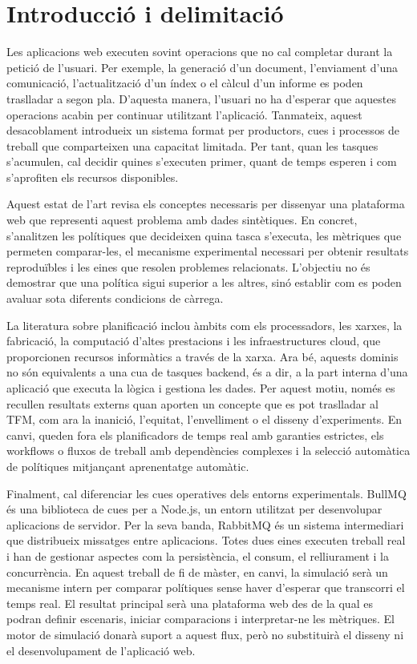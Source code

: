 \section{Introducció i delimitació}

Les aplicacions web executen sovint operacions que no cal completar durant la
petició de l'usuari. Per exemple, la generació d'un document, l'enviament d'una
comunicació, l'actualització d'un índex o el càlcul d'un informe es poden
traslladar a segon pla. D'aquesta manera, l'usuari no ha d'esperar que aquestes
operacions acabin per continuar utilitzant l'aplicació. Tanmateix, aquest
desacoblament introdueix un sistema format per productors, cues i processos de
treball que comparteixen una capacitat limitada. Per tant, quan les tasques
s'acumulen, cal decidir quines s'executen primer, quant de temps esperen i com
s'aprofiten els recursos disponibles.

Aquest estat de l'art revisa els conceptes necessaris per dissenyar una
plataforma web que representi aquest problema amb dades sintètiques. En concret,
s'analitzen les polítiques que decideixen quina tasca s'executa, les mètriques
que permeten comparar-les, el mecanisme experimental necessari per obtenir
resultats reproduïbles i les eines que resolen problemes relacionats. L'objectiu
no és demostrar que una política sigui superior a les altres, sinó establir com
es poden avaluar sota diferents condicions de càrrega.

La literatura sobre planificació inclou àmbits com els processadors, les xarxes,
la fabricació, la computació d'altes prestacions i les infraestructures cloud,
que proporcionen recursos informàtics a través de la xarxa. Ara bé, aquests
dominis no són equivalents a una cua de tasques backend, és a dir, a la part
interna d'una aplicació que executa la lògica i gestiona les dades. Per aquest
motiu, només es recullen resultats externs quan aporten un concepte que es pot
traslladar al TFM, com ara la inanició, l'equitat, l'envelliment o el disseny
d'experiments. En canvi, queden fora els planificadors de temps real amb
garanties estrictes, els workflows o fluxos de treball amb dependències
complexes i la selecció automàtica de polítiques mitjançant aprenentatge
automàtic.

Finalment, cal diferenciar les cues operatives dels entorns experimentals.
BullMQ és una biblioteca de cues per a Node.js, un entorn utilitzat per
desenvolupar aplicacions de servidor. Per la seva banda, RabbitMQ és un sistema
intermediari que distribueix missatges entre aplicacions. Totes dues eines
executen treball real i han de gestionar aspectes com la
persistència, el consum, el relliurament i la concurrència. En aquest treball de
fi de màster, en canvi, la simulació serà un mecanisme intern per comparar
polítiques sense haver d'esperar que transcorri el temps real. El resultat
principal serà una plataforma web des de la qual es podran definir escenaris,
iniciar comparacions i interpretar-ne les mètriques. El motor de simulació
donarà suport a aquest flux, però no substituirà el disseny ni el desenvolupament
de l'aplicació web.
